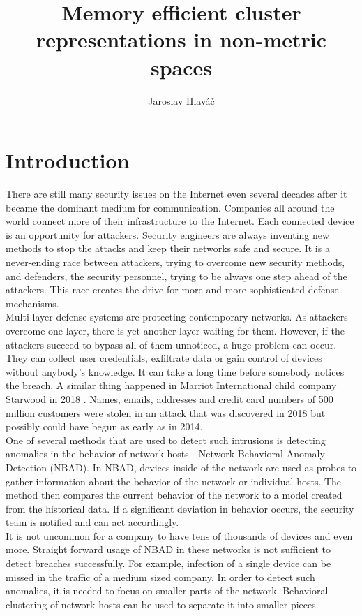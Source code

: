 \documentclass[thesis=B,english]{FITthesis}[2012/10/20]
\title{ Memory efficient cluster representations in non-metric spaces}
\author{Jaroslav Hlaváč} %
\begin{document}

\chapter{Introduction}

There are still many security issues on the Internet even several decades after it became the dominant medium for communication.
Companies all around the world connect more of their infrastructure to the Internet.
Each connected device is an opportunity for attackers.
Security engineers are always inventing new methods to stop the attacks and keep their networks safe and secure.
It is a never-ending race between attackers, trying to overcome new security methods, and defenders, the security personnel, trying to be always one step ahead of the attackers.
This race creates the drive for more and more sophisticated defense mechanisms. \\

Multi-layer defense systems are protecting contemporary networks.
As attackers overcome one layer, there is yet another layer waiting for them.
However, if the attackers succeed to bypass all of them unnoticed, a huge problem can occur.
They can collect user credentials,  exfiltrate data or gain control of devices without anybody's knowledge.
It can take a long time before somebody notices the breach.
A similar thing happened in Marriot International child company Starwood in 2018 \cite{hron2018breaches}.
Names, emails, addresses and credit card numbers of 500 million customers were stolen in an attack that was discovered in 2018 but possibly could have begun as early as in 2014. \\

One of several methods that are used to detect such intrusions is detecting anomalies in the behavior of network hosts - Network Behavioral Anomaly Detection (NBAD).
In NBAD, devices inside of the network are used as probes to gather information about the behavior of the network or individual hosts.
The method then compares the current behavior of the network to a model created from the historical data.
If a significant deviation in behavior occurs, the security team is notified and can act accordingly. \\

It is not uncommon for a company to have tens of thousands of devices and even more.
Straight forward usage of NBAD in these networks is not sufficient to detect breaches successfully.
For example, infection of a single device can be missed in the traffic of a medium sized company.
In order to detect such anomalies, it is needed to focus on smaller parts of the network.
Behavioral clustering of network hosts can be used to separate it into smaller pieces. \\
\end{document}
